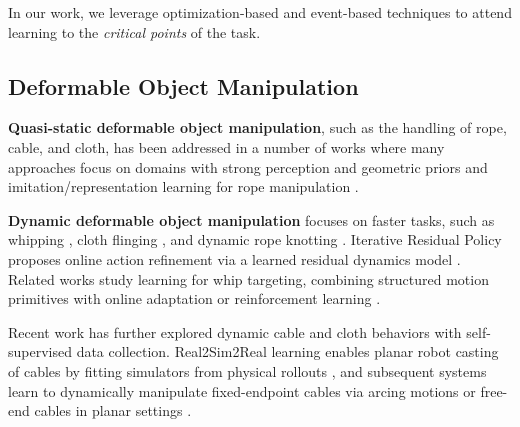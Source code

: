 \documentclass[conference]{IEEEtran}
\begin{document}
In our work, we leverage optimization-based and event-based techniques to attend learning to the \textit{critical points} of the task.


\subsection{Deformable Object Manipulation}
\textbf{Quasi-static deformable object manipulation}, such as the handling of rope, cable, and cloth, has been addressed in a number of works \cite{9813374, doi:10.1126/scirobotics.abd8803} where many approaches focus on domains with strong perception and geometric priors \citep{tang_framework_2018} and imitation/representation learning for rope manipulation \cite{nair2017combining,hannus2024dynamic,huang2023act}. 

\textbf{Dynamic deformable object manipulation} focuses on faster tasks, such as whipping \cite{nah_2020}, cloth flinging \cite{chen_efficiently_2022, 5979606}, and dynamic rope knotting \citep{yamakawa_dynamic_2013}. 
Iterative Residual Policy proposes online action refinement via a learned residual dynamics model \citep{chi_iterative_2022}. Related works study learning for whip targeting, combining structured motion primitives with online adaptation or reinforcement learning \citep{xiong_online_2021,wang_learning-based_2024}.

Recent work has further explored dynamic cable and cloth behaviors with self-supervised data collection. Real2Sim2Real learning enables planar robot casting of cables by fitting simulators from physical rollouts \citep{lim_real2sim2real_2022}, and subsequent systems learn to dynamically manipulate fixed-endpoint cables via arcing motions \citep{zhang_robots_2024} or free-end cables in planar settings \citep{wang_self-supervised_2024}. 
\end{document}
